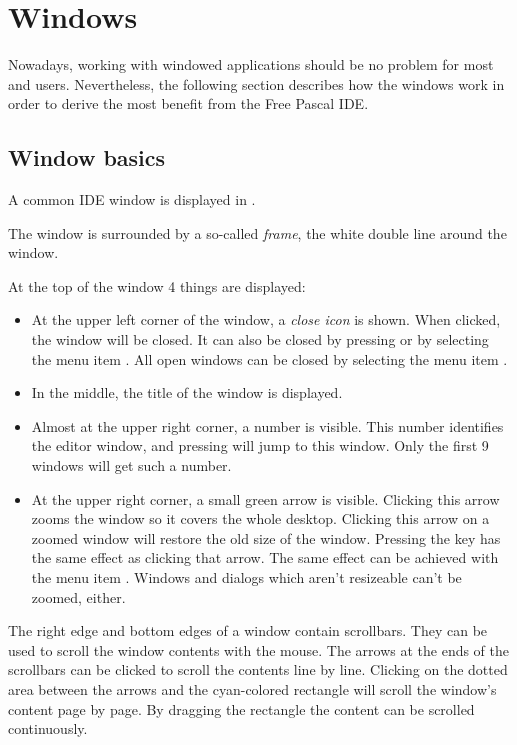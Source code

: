 \section{Windows}
\label{se:windows}
Nowadays, working with windowed applications should be no problem for
most \windows and \linux users. Nevertheless, the following section
describes how the windows work in order to derive the most benefit from the
Free Pascal IDE.
%
%
\subsection{Window basics}
\label{se:windowbasics}

A common IDE window is displayed in .


The window is surrounded by a so-called \emph{frame}, the white double
line around the window.

At the top of the window 4 things are displayed:
\begin{itemize}
\item
At the upper left corner of the window, a \emph{close icon} is shown.
When clicked, the window will be closed. It can also be closed by
 pressing  or by selecting the menu item .
All open windows can be closed by selecting the menu item
.
\item In the middle, the title of the window is displayed.
\item Almost at the upper right corner, a number is visible.
This number identifies the editor window, and pressing 
will jump to this window. Only the first 9 windows will get such a number.
\item At the upper right corner, a small green arrow is visible.
Clicking this arrow zooms the window so it covers the whole desktop.
Clicking this arrow on a zoomed window will restore the old size of the
window. Pressing the  key has the same effect as clicking
that arrow. The same effect can be achieved with the menu item
.
Windows and dialogs which aren't resizeable can't be zoomed, either.
\end{itemize}

The right edge and bottom edges of a window contain scrollbars.
They can be used to scroll the window contents with the mouse.
The arrows at the ends of the scrollbars can be clicked to scroll the
contents line by line. Clicking on the dotted area between the arrows
and the cyan-colored rectangle will scroll the window's content
page by page. By dragging the rectangle the content can be scrolled
continuously.

